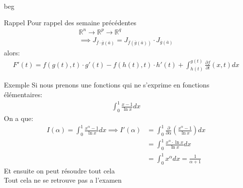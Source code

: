 beg
\begin{parag}{Rappel}
    Pour rappel des semaine précédentes
    \begin{align*}
       \mathbb{R}^n  \to \mathbb{R}^p \to \mathbb{R}^q \\
       \implies J_{ \overline{f} \cdot \overline{g}( \overline{a})} = J_{ \overline{f} ( \overline{g} ( \overline{a}))} \cdot J_{ \overline{g} ( \overline{a})}
    \end{align*}
alors:
\begin{align*}
    F'(t) = f(g(t), t) \cdot g'(t) - f(h(t), t) \cdot h'(t) + \int_{h(t)}^{g(t)} \frac{\partial f}{\partial t}( x, t)dx
\end{align*}

\begin{subparag}{Exemple}
    Si nous prenons une fonctions qui ne s'exprime en fonctions élémentaires:
    \begin{align*}
        \int_0^1 \frac{x - 1}{ \ln x} dx
    \end{align*}
    On a que:
    \begin{align*}
        I( \alpha) = \int_0^1 \frac{x^\alpha - 1}{\ln x} dx \implies I'( \alpha) &= \int_0^1 \frac{\partial}{\partial \alpha} ( \frac{x^{ \alpha} - 1}{ \ln x}) dx \\
                   &= \int_0^1 \frac{x^\alpha \cdot \ln x}{\ln x} dx \\
                   &= \int_0^1 x^{ \alpha} dx = \frac{1}{ \alpha + 1}
    \end{align*}
    Et ensuite on peut résoudre tout cela\\
    Tout cela ne se retrouve pas a l'examen
\end{subparag}

\end{parag}

